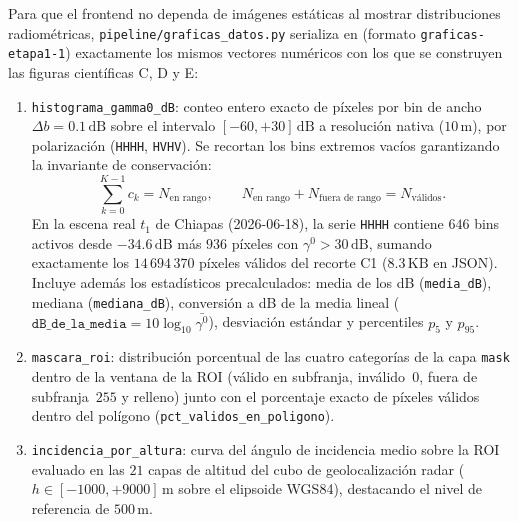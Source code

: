 \documentclass[11pt,a4paper]{article}
\newcommand{\src}[1]{\nolinkurl{#1}}
\newcommand{\unit}[1]{\mathrm{#1}}
\newcommand{\gz}{\ensuremath{\gamma^{0}}}
\begin{document}
Para que el frontend no dependa de imágenes estáticas al mostrar distribuciones radiométricas, \src{pipeline/graficas\_datos.py}
serializa en  (formato \texttt{graficas-etapa1-1}) exactamente los mismos vectores numéricos
con los que se construyen las figuras científicas C, D y E:
\begin{enumerate}
  \item \texttt{histograma\_gamma0\_dB}: conteo entero exacto de píxeles por bin de ancho $\Delta b = 0.1\,\unit{dB}$
        sobre el intervalo $[-60, +30]\,\unit{dB}$ a resolución nativa ($10\,\unit{m}$), por polarización
        (\texttt{HHHH}, \texttt{HVHV}). Se recortan los bins extremos vacíos garantizando la invariante de
        conservación:
        \begin{equation}
          \sum_{k=0}^{K-1} c_k = N_{\text{en rango}}, \qquad
          N_{\text{en rango}} + N_{\text{fuera de rango}} = N_{\text{v\'alidos}}.
          \label{eq:invariante-histograma-etapa1}
        \end{equation}
        En la escena real $t_1$ de Chiapas (2026-06-18), la serie \texttt{HHHH} contiene $646$ bins activos
        desde $-34.6\,\unit{dB}$ más $936$ píxeles con $\gz > 30\,\unit{dB}$, sumando exactamente los
        $14\,694\,370$ píxeles válidos del recorte C1 ($8.3\,\unit{KB}$ en JSON). Incluye además los estadísticos
        precalculados: media de los dB (\texttt{media\_dB}), mediana (\texttt{mediana\_dB}), conversión a dB de
        la media lineal ($\texttt{dB\_de\_la\_media} = 10\log_{10}\bar{\gz}$), desviación estándar y percentiles
        $p_5$ y $p_{95}$.
  \item \texttt{mascara\_roi}: distribución porcentual de las cuatro categorías de la capa \texttt{mask} dentro
        de la ventana de la ROI (válido en subfranja, inválido~$0$, fuera de subfranja~$255$ y relleno) junto con
        el porcentaje exacto de píxeles válidos dentro del polígono (\texttt{pct\_validos\_en\_poligono}).
  \item \texttt{incidencia\_por\_altura}: curva del ángulo de incidencia medio sobre la ROI evaluado en las $21$
        capas de altitud del cubo de geolocalización radar ($h \in [-1000, +9000]\,\unit{m}$ sobre el elipsoide
        WGS84), destacando el nivel de referencia de $500\,\unit{m}$.
\end{enumerate}
\end{document}
